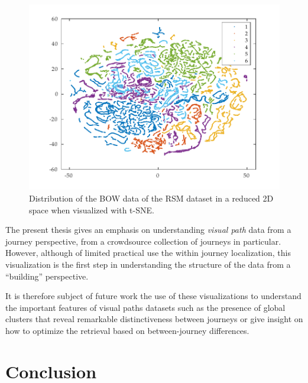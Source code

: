 \begin{figure}
\centering
\includegraphics[width=\textwidth]{gfx/Chapter04/tsne_dsift_2d.pdf}
\caption{Distribution of the BOW data of the RSM dataset in a reduced 2D space when visualized with t-SNE.}
\label{fig:tsne2d}
\end{figure}

The present thesis gives an emphasis on understanding \textit{visual path} data from a journey perspective, from a crowdsource collection of journeys in particular. However, although of limited practical use the within journey localization, this visualization is the first step in understanding the structure of the data from a ``building'' perspective.

It is therefore subject of future work the use of these visualizations to understand the important features of visual paths datasets such as the presence of global clusters that reveal remarkable distinctiveness between journeys or give insight on how to optimize the retrieval based on between-journey differences.

\section{Conclusion}

